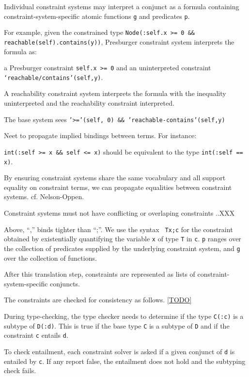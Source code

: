 Individual constraint systems may interpret a conjunct as a
formula containing constraint-system-specific atomic functions
{\tt g} and predicates {\tt p}.  

For example, given the constrained type
{\tt Node(:self.x >= 0 \&\& reachable(self).contains(y))},
Presburger constraint system interprets the formula as:

a Presburger constraint {\tt self.x >= 0}
and
an uninterpreted constraint {\tt `reachable/contains'(self,y)}.

A reachability constraint system interprets the formula with the
inequality uninterpreted and the reachability constraint
interpreted.

The base system sees {\tt '>='(self, 0) \&\& 'reachable-contains'(self,y)} 

Neet to propagate implied bindings between terms.  For instance:

{\tt int(:self >= x \&\& self <= x)}
should be equivalent to the type
{\tt int(:self == x)}.

By ensuring constraint systems share the same vocabulary and all
support equality on constraint terms, we can propagate
equalities between constraint systems.
cf. Nelson-Oppen.

Constraint systems must not have conflicting or overlaping
constraints ..XXX

Above, ``,'' binds tighter than ``;''. We use the syntax {\tt
{\tt T\;x};\;c} for the constraint obtained by existentially
quantifying the
variable {\tt x} of type {\tt T} in {\tt c}. {\tt p} ranges over
the collection of predicates supplied by the underlying
constraint
system, and {\tt g} over the collection of functions.




After this translation step, constraints are represented as
lists of constraint-system-specific conjuncts.

The constraints are checked for consistency as follows.
\ref{TODO}
\fi

During type-checking, the type checker needs to determine if the
type
{\tt C(:c)} is a subtype of {\tt D(:d)}.  This is true if 
the base type {\tt C} is a subtype of {\tt D} and if the
constraint {\tt c} entails {\tt d}.

To check entailment, each constraint solver is asked if
a given conjunct of {\tt d} is entailed by {\tt c}.
If any report false, the entailment does not hold and the
subtyping check fails.


